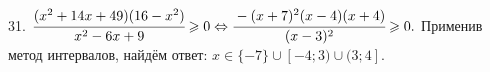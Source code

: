 31. $\cfrac{(x^2+14x+49)(16-x^2)}{x^2-6x+9}\geqslant0\Leftrightarrow\cfrac{-(x+7)^2(x-4)(x+4)}{(x-3)^2}\geqslant0.$ Применив метод интервалов, найдём ответ: $x\in
\{-7\}\cup[-4;3)\cup(3;4].$
\begin{figure}[ht!]
\end{figure}\\
